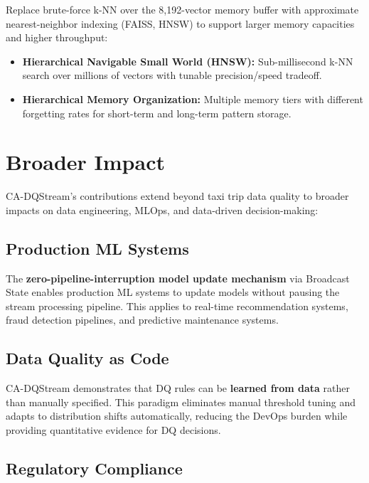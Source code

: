 Replace brute-force k-NN over the 8,192-vector memory buffer with approximate nearest-neighbor indexing (FAISS, HNSW) to support larger memory capacities and higher throughput:

\begin{itemize}
    \item \textbf{Hierarchical Navigable Small World (HNSW):} Sub-millisecond k-NN search over millions of vectors with tunable precision/speed tradeoff.
    \item \textbf{Hierarchical Memory Organization:} Multiple memory tiers with different forgetting rates for short-term and long-term pattern storage.
\end{itemize}

\section{Broader Impact}

CA-DQStream's contributions extend beyond taxi trip data quality to broader impacts on data engineering, MLOps, and data-driven decision-making:

\subsection{Production ML Systems}

The \textbf{zero-pipeline-interruption model update mechanism} via Broadcast State enables production ML systems to update models without pausing the stream processing pipeline. This applies to real-time recommendation systems, fraud detection pipelines, and predictive maintenance systems.

\subsection{Data Quality as Code}

CA-DQStream demonstrates that DQ rules can be \textbf{learned from data} rather than manually specified. This paradigm eliminates manual threshold tuning and adapts to distribution shifts automatically, reducing the DevOps burden while providing quantitative evidence for DQ decisions.

\subsection{Regulatory Compliance}

